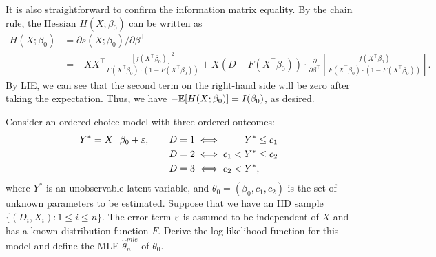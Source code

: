 \documentclass[11pt, A4paper, openany, uplatex]{book}
\begin{document}
It is also straightforward to confirm the information matrix equality.
By the chain rule, the Hessian $H(X; \beta_0)$ can be written as
\begin{align*}
	H(X; \beta_0) 
	& = \partial s(X; \beta_0)/ \partial \beta^\top \\
	& = - XX^\top \frac{[f(X^\top \beta_0)]^2}{F(X^\top \beta_0) \cdot (1 -  F(X^\top\beta_0)) } + X (D - F(X^\top \beta_0)) \cdot \frac{\partial}{\partial \beta^\top} \left[ \frac{f(X^\top \beta_0)}{F(X^\top \beta_0) \cdot (1 -  F(X^\top\beta_0)) }\right].
\end{align*}
By LIE, we can see that the second term on the right-hand side will be zero after taking the expectation.
Thus, we have $-\mathbb{E}[H(X; \beta_0) ] = I(\beta_0)$, as desired.

\begin{framed}
\begin{exercise}\upshape
	Consider an ordered choice model with three ordered outcomes:
	\begin{align*}
	Y^* 
	= X^\top\beta_0 + \varepsilon, \qquad D = 1 \iff  \qquad\:  Y^* & \le c_1 \\
	D = 2  \iff c_1 < Y^* & \le c_2 \\
	D = 3  \iff c_2 < Y^* &,
	\end{align*}
	where $Y^*$ is an unobservable latent variable, and $\theta_0 = (\beta_0, c_1, c_2)$ is the set of unknown parameters to be estimated.
	Suppose that we have an IID sample $\{(D_i, X_i): 1 \le i \le n\}$.
	The error term $\varepsilon$ is assumed to be independent of $X$ and has a known distribution function $F$.
	Derive the log-likelihood function for this model and define the MLE $\hat \theta_n^{mle}$ of $\theta_0$.
\end{exercise}
\end{framed}
\end{document}
